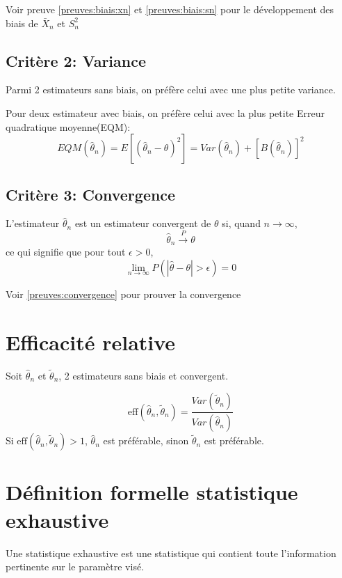 Voir preuve \ref{preuves:biais:xn} et \ref{preuves:biais:sn} pour le
développement des biais de \(\bar{X}_n\) et \(S_n^2\)

\subsection{Critère 2: Variance}\label{stats:criteres:variance}

Parmi 2 estimateurs sans biais, on préfère celui avec une plus petite
variance.

Pour deux estimateur avec biais, on préfère celui avec la plus petite
Erreur quadratique moyenne(EQM): \[
EQM\left(\hat{\theta}_n\right)= E\left[(\hat{\theta}_n-\theta)^2\right]= Var\left(\hat{\theta}_n\right)+\left[B(\hat{\theta}_n)\right]^2
\]

\subsection{Critère 3: Convergence}\label{stats:convergence}

L'estimateur \(\hat{\theta}_n\) est un estimateur convergent de
\(\theta\) si, quand \(n\to \infty\), \[
\hat{\theta}_n\xrightarrow{P}\theta
\] ce qui signifie que pour tout \(\epsilon>0\), \[
\lim_{n\to\infty}P(|\hat{\theta}-\theta|>\epsilon)=0
\]

Voir \ref{preuves:convergence} pour prouver la convergence

\section{Efficacité relative}\label{stats:effrela}

Soit \(\hat{\theta}_n\) et \(\tilde{\theta}_n\), 2 estimateurs sans
biais et convergent.

\[
\text{eff}(\hat{\theta}_n,\tilde{\theta}_n)= \frac{Var(\tilde{\theta}_n)}{Var(\hat{\theta}_n)}
\] Si \(\text{eff}(\hat{\theta}_n,\tilde{\theta}_n)>1\),
\(\hat{\theta}_n\) est préférable, sinon \(\tilde{\theta}_n\) est
préférable.

\section{Définition formelle statistique exhaustive}\label{definition-formelle-statistique-exhaustive}

Une statistique exhaustive est une statistique qui contient toute
l'information pertinente sur le paramètre visé.

